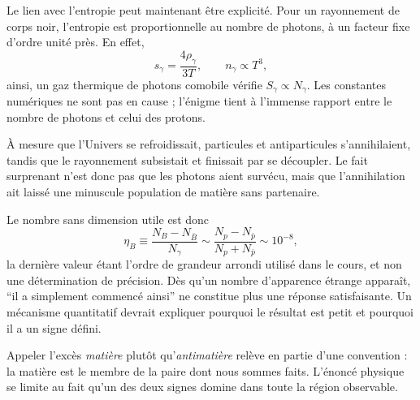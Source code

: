 Le lien avec l’entropie peut maintenant être explicité. Pour un rayonnement de corps noir, l’entropie est proportionnelle au nombre de photons, à un facteur fixe d’ordre unité près. En effet,
\begin{equation}
s_\gamma=\frac{4\rho_\gamma}{3T},
\qquad
n_\gamma\propto T^3,
\end{equation}
ainsi, un gaz thermique de photons comobile vérifie \(S_\gamma\propto N_\gamma\). Les constantes numériques ne sont pas en cause ; l’énigme tient à l’immense rapport entre le nombre de photons et celui des protons.

\begin{classroomqa}
\end{classroomqa}

À mesure que l’Univers se refroidissait, particules et antiparticules s’annihilaient, tandis que le rayonnement subsistait et finissait par se découpler. Le fait surprenant n’est donc pas que les photons aient survécu, mais que l’annihilation ait laissé une minuscule population de matière sans partenaire.

Le nombre sans dimension utile est donc
\begin{equation}
\eta_B
\equiv
\frac{N_B-N_{\bar B}}{N_\gamma}
\sim
\frac{N_p-N_{\bar p}}{N_p+N_{\bar p}}
\sim 10^{-8},
\label{eq:c08-baryon-asymmetry}
\end{equation}
la dernière valeur étant l’ordre de grandeur arrondi utilisé dans le cours, et non une détermination de précision. Dès qu’un nombre d’apparence étrange apparaît, ``il a simplement commencé ainsi'' ne constitue plus une réponse satisfaisante. Un mécanisme quantitatif devrait expliquer pourquoi le résultat est petit et pourquoi il a un signe défini.

Appeler l’excès \emph{matière} plutôt qu’\emph{antimatière} relève en partie d’une convention : la matière est le membre de la paire dont nous sommes faits. L’énoncé physique se limite au fait qu’un des deux signes domine dans toute la région observable.

